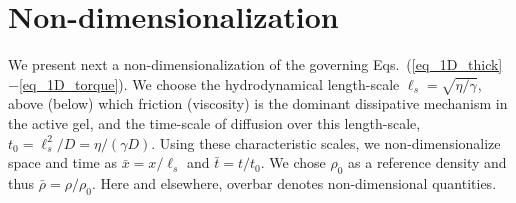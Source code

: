 \pagebreak
\section{\label{sec:level2}Non-dimensionalization}  \label{appendix_1_sec_5}


We present next a non-dimensionalization of the governing Eqs.~(\ref{eq_1D_thick}$-$\ref{eq_1D_torque}). We choose the hydrodynamical length-scale $\ell_s=\sqrt{\eta / \gamma}$, above (below) which friction (viscosity) is the dominant dissipative mechanism in the active gel, and the time-scale of diffusion over this length-scale, $t_0 = \ell_s^2  /  D = \eta /(\gamma D)$. Using these characteristic scales, we non-dimensionalize space and time as $\bar{x} = x/\ell_s$ and $\bar{t}=t/t_0$. We chose $\rho_0$ as a reference density and thus $ \bar{\rho} =  \rho  / \rho_0$. Here and elsewhere, overbar denotes non-dimensional quantities.


